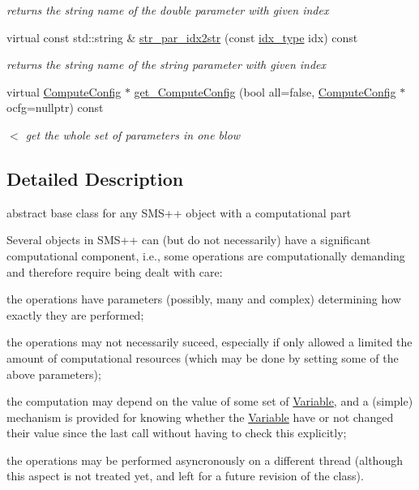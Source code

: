 \begin{Indent}
\begin{DoxyCompactItemize}
\begin{DoxyCompactList}\small\item\em returns the string name of the double parameter with given index \end{DoxyCompactList}\item 
virtual const std\+::string \& \mbox{\hyperlink{class_s_m_spp__di__unipi__it_1_1_thin_compute_interface_ad886220da008681ec350ce43aac421ee}{str\+\_\+par\+\_\+idx2str}} (const \mbox{\hyperlink{class_s_m_spp__di__unipi__it_1_1_thin_compute_interface_aa3d710629ad8c434286726ad810c3b47}{idx\+\_\+type}} idx) const
\begin{DoxyCompactList}\small\item\em returns the string name of the string parameter with given index \end{DoxyCompactList}\item 
virtual \mbox{\hyperlink{class_s_m_spp__di__unipi__it_1_1_compute_config}{Compute\+Config}} $\ast$ \mbox{\hyperlink{class_s_m_spp__di__unipi__it_1_1_thin_compute_interface_adaa8da125823294995410c022a59a4b5}{get\+\_\+\+Compute\+Config}} (bool all=false, \mbox{\hyperlink{class_s_m_spp__di__unipi__it_1_1_compute_config}{Compute\+Config}} $\ast$ocfg=nullptr) const
\begin{DoxyCompactList}\small\item\em $<$ get the whole set of parameters in one blow \end{DoxyCompactList}\end{DoxyCompactItemize}
\end{Indent}


\subsection{Detailed Description}
abstract base class for any S\+M\+S++ object with a computational part 

Several objects in S\+M\+S++ can (but do not necessarily) have a significant computational component, i.\+e., some operations are computationally demanding and therefore require being dealt with care\+:


\begin{DoxyItemize}
\item the operations have parameters (possibly, many and complex) determining how exactly they are performed;
\item the operations may not necessarily suceed, especially if only allowed a limited the amount of computational resources (which may be done by setting some of the above parameters);
\item the computation may depend on the value of some set of \mbox{\hyperlink{class_s_m_spp__di__unipi__it_1_1_variable}{Variable}}, and a (simple) mechanism is provided for knowing whether the \mbox{\hyperlink{class_s_m_spp__di__unipi__it_1_1_variable}{Variable}} have or not changed their value since the last call without having to check this explicitly;
\item the operations may be performed asyncronously on a different thread (although this aspect is not treated yet, and left for a future revision of the class).
\end{DoxyItemize}

